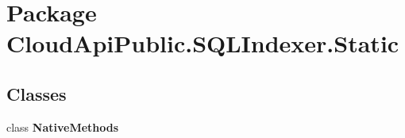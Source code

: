 \hypertarget{namespace_cloud_api_public_1_1_s_q_l_indexer_1_1_static}{\section{Package Cloud\-Api\-Public.\-S\-Q\-L\-Indexer.\-Static}
\label{namespace_cloud_api_public_1_1_s_q_l_indexer_1_1_static}
}
\subsection*{Classes}
\begin{DoxyCompactItemize}
\item 
class {\bfseries Native\-Methods}
\end{DoxyCompactItemize}
